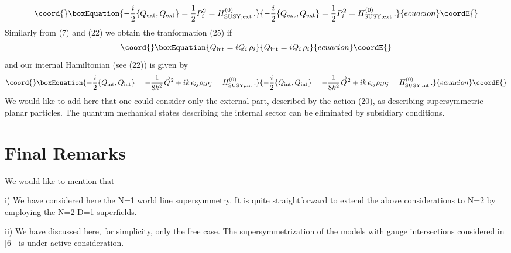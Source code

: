 \documentclass[a4paper,12pt]{article}
\begin{document}
\begin{equation}\coord{}\boxEquation{\label{pary2.27}
-  \frac{i}{2}
\{Q_{\rm ext}, Q_{\rm ext} \}  
 =
  \frac{1}{2} {P}_i^2 = H_{\rm SUSY;ext}^{(0)}\, .
}{-  \frac{i}{2}
\{Q_{\rm ext}, Q_{\rm ext} \}  
 =
  \frac{1}{2} {P}_i^2 = H_{\rm SUSY;ext}^{(0)}\, .
}{ecuacion}\coordE{}\end{equation}
Similarly from (7) and (22) we obtain the tranformation (25) if
\begin{equation}\coord{}\boxEquation{\label{pary2.28}
Q_{\rm int} = i Q_i \, \rho_i
}{Q_{\rm int} = i Q_i \, \rho_i
}{ecuacion}\coordE{}\end{equation}
and our internal Hamiltonian (see (22)) is given by
\begin{equation}\coord{}\boxEquation{\label{pary2.29}
-  \frac{i}{2}                
\{Q_{\rm int}, Q_{\rm int} \} 
=
- \frac{1}{8k^2} \overrightarrow{Q}^2 
 + i k\, \epsilon_{ij}
\rho_i \rho_j = H_{\rm SUSY;int}^{(0)} \, .
}{-  \frac{i}{2}                
\{Q_{\rm int}, Q_{\rm int} \} 
=
- \frac{1}{8k^2} \overrightarrow{Q}^2 
 + i k\, \epsilon_{ij}
\rho_i \rho_j = H_{\rm SUSY;int}^{(0)} \, .
}{ecuacion}\coordE{}\end{equation}
We would like to add  here that one could consider only the 
external
 part, described by the action (20), as describing supersymmetric 
planar
 particles. The quantum mechanical states describing
  the  internal sector   can be 
 eliminated by  subsidiary conditions.




\section{Final Remarks}
We would like to mention that

i) We have  considered here the N=1 world line supersymmetry. It is
quite straightforward to extend the above considerations to N=2 by
 employing  the N=2 D=1 superfields.

 ii) We have  discussed here, for simplicity, only the free case. The
 supersymmetrization of the models with gauge intersections 
considered
  in [6 ] is under active  consideration.
\end{document}
